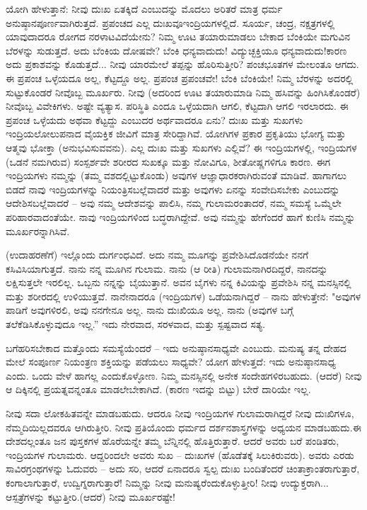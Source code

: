 ಯೋಗಿ ಹೇಳುತ್ತಾನೆ: ನೀವು ದುಃಖ ಏತಕ್ಕಿದೆ ಎಂಬುದನ್ನು ಮೊದಲು ಅರಿತರೆ ಮಾತ್ರ ಧರ್ಮ ಅನುಷ್ಠಾನಪೂರ್ಣವಾಗಿರುತ್ತದೆ. ಪ್ರಪಂಚದ ಎಲ್ಲ ದುಃಖವೂ\break ಇಂದ್ರಿಯಗಳಲ್ಲಿದೆ. ಸೂರ್ಯ, ಚಂದ್ರ, ನಕ್ಷತ್ರಗಳಲ್ಲಿ ಯಾವುದಾದರೂ ರೋಗದ ನರಳಾಟವಿದೆಯೇನು? ನಿಮ್ಮ ಊಟ ತಯಾರುಮಾಡಲು ಬೇಕಾದ ಬೆಂಕಿಯೇ ಮಗುವಿನ ಬೆರಳನ್ನು ಸುಡುತ್ತದೆ. ಅದು ಬೆಂಕಿಯ ದೋಷವೇ? ಬೆಂಕಿ ಧನ್ಯವಾದುದು! ವಿದ್ಯುಚ್ಛಕ್ತಿಯೂ ಧನ್ಯವಾದುದು!ಕಾರಣ ಅದು ಪ್ರಕಾಶವನ್ನು ಕೊಡುತ್ತದೆ... ನೀವು ಯಾರಮೇಲೆ ತಪ್ಪನ್ನು ಹೊರಿಸುತ್ತೀರಿ? ಪಂಚಭೂತಗಳ ಮೇಲಂತೂ ಆಗದು. ಈ ಪ್ರಪಂಚ ಒಳ್ಳೆಯದೂ ಅಲ್ಲ, ಕೆಟ್ಟದ್ದೂ ಅಲ್ಲ. ಪ್ರಪಂಚ ಪ್ರಪಂಚವೇ! ಬೆಂಕಿ ಬೆಂಕಿಯೇ! ನಿಮ್ಮ ಬೆರಳನ್ನು ಅದರಲ್ಲಿ ಸುಟ್ಟುಕೊಂಡರೆ ನೀವೊಬ್ಬ ಮೂರ್ಖರು. ನೀವು (ಅದರಿಂದ ಊಟ ತಯಾರುಮಾಡಿ ನಿಮ್ಮ ಹಸಿವನ್ನು ಹಿಂಗಿಸಿಕೊಂಡರೆ) ನೀವೊಬ್ಬ ವಿವೇಕಿಗಳು. ಅಷ್ಟೇ ವ್ಯತ್ಯಾಸ. ಪರಿಸ್ಥಿತಿ ಎಂದೂ ಒಳ್ಳೆಯದಾಗಿ ಆಗಲಿ, ಕೆಟ್ಟದಾಗಿ ಆಗಲಿ ಇರಲಾರದು. ಈ ಪ್ರಪಂಚ ಒಳ್ಳೆಯದು ಅಥವಾ ಕೆಟ್ಟದ್ದು ಎಂಬುದರ ಅರ್ಥವಾದರೂ ಏನು? ದುಃಖ ಮತ್ತು ಸುಖಗಳು ಇಂದ್ರಿಯಲೋಲುಪನಾದ ವೈಯಕ್ತಿಕ ಜೀವಿಗೆ ಮಾತ್ರ ಸೇರಿದ್ದಾಗಿವೆ. ಯೋಗಿಗಳ ಪ್ರಕಾರ ಪ್ರಕೃತಿಯು ಭೋಗ್ಯ ಮತ್ತು ಆತ್ಮವು ಭೋಕ್ತಾ (ಅನುಭವಿಸುವವನು). ಎಲ್ಲ ದುಃಖ ಮತ್ತು ಸುಖಗಳು ಎಲ್ಲಿವೆ? ಈ ಇಂದ್ರಿಯಗಳಲ್ಲಿ, ಇಂದ್ರಿಯಗಳ (ಒಡನೆ ನಮಗಿರುವ) ಸಂಸ್ಪರ್ಶವೇ ಶರೀರದ ಸುಖಕ್ಕೂ ಮತ್ತು ನೋವಿಗೂ, ಶೀತೋಷ್ಣಗಳಿಗೂ ಕಾರಣ. ಈಗ ಇಂದ್ರಿಯಗಳು ನಮ್ಮನ್ನು (ತಮ್ಮ ವಶದಲ್ಲಿಟ್ಟುಕೊಂಡು) ಅವುಗಳ ಆಜ್ಞಾಧಾರಕರಾಗಿರುವಂತೆ ಮಾಡಿವೆ. ಹಾಗಾಗಲು ಬಿಡದೆ ನಾವು ಇಂದ್ರಿಯಗಳನ್ನು ನಿಯಂತ್ರಿಸಬಲ್ಲೆವಾದರೆ ಮತ್ತು ಅವುಗಳು ಏನನ್ನು ಸಂವೇದಿಸಬೇಕು ಎಂಬುದನ್ನು ಆದೇಶಿಸಬಲ್ಲೆವಾದರೆ – ಅವು ನಮ್ಮ ಆದೇಶವನ್ನು ಪಾಲಿಸಿ, ನಮ್ಮ ಗುಲಾಮರಂತಾದರೆ, ನಮ್ಮ ಸಮಸ್ಯೆ ಒಮ್ಮೆಲೇ ಪರಿಹಾರವಾದಂತೆಯೇ. ನಾವು ಇಂದ್ರಿಯಗಳಿಂದ ಬದ್ಧರಾಗಿದ್ದೇವೆ. ಅವು ನಮ್ಮನ್ನು ಹೇಗೆಂದರೆ ಹಾಗೆ ಕುಣಿಸಿ ನಮ್ಮನ್ನು ಮೂರ್ಖರನ್ನಾಗಿಸಿವೆ.

(ಉದಾಹರಣೆಗೆ) ಇಲ್ಲೊಂದು ದುರ್ಗಂಧವಿದೆ. ಅದು ನಮ್ಮ ಮೂಗನ್ನು ಪ್ರವೇಶಿಸಿದೊಡನೆಯೇ ನನಗೆ ಕಸಿವಿಸಿಯಾಗುತ್ತದೆ. ನಾನು ನನ್ನ ಮೂಗಿನ ಗುಲಾಮ. ನಾನು (ಆ ರೀತಿ) ಗುಲಾಮನಾಗಿರದಿದ್ದರೆ, ನಾನದನ್ನು ಲಕ್ಷಿಸುತ್ತಲೇ ಇರಲಿಲ್ಲ. ಒಬ್ಬನು ನನ್ನನ್ನು ಬೈಯುತ್ತಾನೆ. ಅವನ ಬೈಗಳು ನನ್ನ ಕಿವಿಯನ್ನು ಪ್ರವೇಶಿಸಿ ನನ್ನ ಮನಸ್ಸಿನಲ್ಲಿ ಮತ್ತು ಶರೀರದಲ್ಲಿ ಉಳಿಯುತ್ತವೆ. ನಾನೇನಾದರೂ (ಇಂದ್ರಿಯಗಳ) ಒಡೆಯನಾಗಿದ್ದರೆ – ನಾನು ಹೇಳುತ್ತೇನೆ: "ಅವುಗಳ ಪಾಡಿಗೆ ಅವುಗಳಿರಲಿ, ಅವು ನನಗೇನೂ ಅಲ್ಲ. ನಾನು ದುಃಖಿಯೂ ಅಲ್ಲ. ನಾನು (ಅವುಗಳ ಬಗ್ಗೆ ತಲೆಕೆಡಿಸಿಕೊಳ್ಳುವುದೂ ಇಲ್ಲ.” ಇದು ನೇರವಾದ, ಸರಳವಾದ, ಮತ್ತು ಸ್ಪಷ್ಟವಾದ ಸತ್ಯ.

ಬಗೆಹರಿಸಬೇಕಾದ ಮತ್ತೊಂದು ಸಮಸ್ಯೆಯೆಂದರೆ – ಇದು ಅನುಷ್ಠಾನಸಾಧ್ಯವೇ ಎಂಬುದು. ಮನುಷ್ಯ ತನ್ನ ದೇಹದ ಮೇಲೆ ಸಂಪೂರ್ಣ ನಿಯಂತ್ರಣ ಶಕ್ತಿಯನ್ನು ಪಡೆಯಲು ಸಾಧ್ಯವೇ? ಯೋಗ ಹೇಳುತ್ತದೆ: ಇದು ಅನುಷ್ಠಾನಸಾಧ್ಯ ಎಂದು. ಒಂದು ವೇಳೆ ಹಾಗಲ್ಲ ಎಂದುಕೊಳ್ಳೋಣ. ನಿಮ್ಮ ಮನಸ್ಸಿನಲ್ಲಿ ಅನೇಕ ಸಂದೇಹಗಳಿರಬಹುದು. (ಆದರೆ) ನೀವು ಆ ದಿಕ್ಕಿನಲ್ಲಿ ಪ್ರಯತ್ನವನ್ನಂತೂ ಮಾಡಲೇಬೇಕಾಗಿದೆ. (ಕಾರಣ ಇದನ್ನು ಬಿಟ್ಟು) ಬೇರೆ ದಾರಿಯೇ ಇಲ್ಲ.

ನೀವು ಸದಾ ಲೋಕಹಿತವನ್ನೇ ಮಾಡಬಹುದು. ಆದರೂ ನೀವು ಇಂದ್ರಿಯಗಳ ಗುಲಾಮರಾಗಿದ್ದರೆ ನೀವು ದುಃಖಿಗಳೂ, ನೆಮ್ಮದಿಯಿಲ್ಲದವರೂ ಆಗಿರುತ್ತೀರಿ. ನೀವು ಪ್ರತಿಯೊಂದು ಧರ್ಮದ ದರ್ಶನಶಾಸ್ತ್ರಗಳನ್ನು ಅಧ್ಯಯನ ಮಾಡಬಹುದು.\break ಈ ದೇಶದಲ್ಲಂತೂ ಜನ ಪುಸ್ತಕಗಳ ಹೊರೆಯನ್ನೇ ತಮ್ಮ ಬೆನ್ನಿನಲ್ಲಿ ಹೊತ್ತಿರುತ್ತಾರೆ. ಆದರೆ ಅವರು ಬರೆ ಪಂಡಿತರು, ಇಂದ್ರಿಯಗಳ ಗುಲಾಮರು. ಆದ್ದರಿಂದಲೇ﻿ ಅವರು ಸುಖ – ದುಃಖಗಳ (ಹೊಡೆತಕ್ಕೆ ಸಿಲುಕಿರುವರು). ಅವರು ಎರಡು ಸಾವಿರ\break ಗ್ರಂಥಗಳನ್ನು ಓದುವರು – ಅದು ಸರಿ, ಆದರೆ ಏನಾದರೂ ಸ್ವಲ್ಪ ದುಃಖ ಬಂದಿತೆಂದರೆ ಚಿಂತಾಕ್ರಾಂತರಾಗುತ್ತಾರೆ, ಕಂಗಾಲಾಗುತ್ತಾರೆ, ಉದ್ವಿಗ್ನರಾಗುತ್ತಾರೆ! ನಿಮ್ಮನ್ನು ನೀವು ಮನುಷ್ಯರೆಂದುಕೊಳ್ಳುತ್ತೀರಿ! ನೀವು ಉದ್ಯುಕ್ತರಾಗಿ... ಆಸ್ಪತ್ರೆಗಳನ್ನು ಕಟ್ಟುತ್ತೀರಿ.\break (ಆದರೆ) ನೀವು ಮೂರ್ಖರಷ್ಟೇ!


